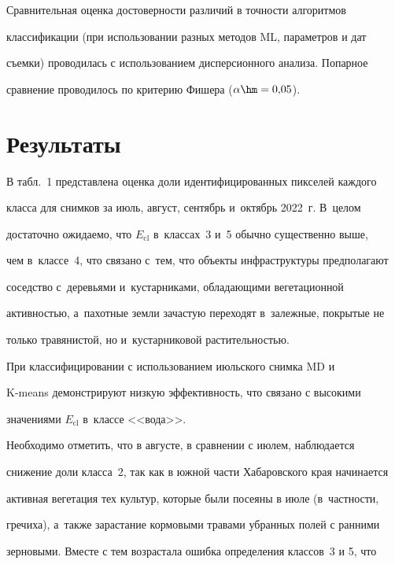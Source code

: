   

  Сравнительная оценка достоверности различий в точности алгоритмов 

классификации (при использовании разных методов ML, параметров и дат 

съемки) проводилась с использованием дисперсионного анализа. Попарное 

сравнение проводилось по критерию Фишера ($\alpha\hm=0{,}05$).

  

\section{Результаты}



  В табл.~1 представлена оценка доли идентифицированных пикселей каждого 

класса для снимков за июль, август, сентябрь и~октябрь 2022~г. В~целом 

достаточно ожидаемо, что $E_{\mathrm{cl}}$ в~классах~3 и~5 обычно существенно выше, 

чем в~классе~4, что связано с~тем, что объекты инфраструктуры предполагают 

соседство с~деревьями и~кустарниками, обладающими вегетационной 

активностью, а~пахотные земли зачастую переходят в~залежные, покрытые не 

только травянистой, но и~кустарниковой растительностью.

  



  

  При классифицировании с использованием июльского снимка MD и  

K-means демонстрируют низкую эффективность, что связано с высокими 

значениями $E_{\mathrm{cl}}$  в~классе <<вода>>.

  

  Необходимо отметить, что в августе, в сравнении с июлем, наблюдается 

снижение доли класса~2, так как в южной части Хабаровского края начинается 

активная вегетация тех культур, которые были посеяны в июле (в~част\-ности, 

гречиха), а~также зарастание кормовыми травами убранных полей с ранними 

зерновыми. Вместе с тем возрастала ошибка определения классов~3 и 5, что 

